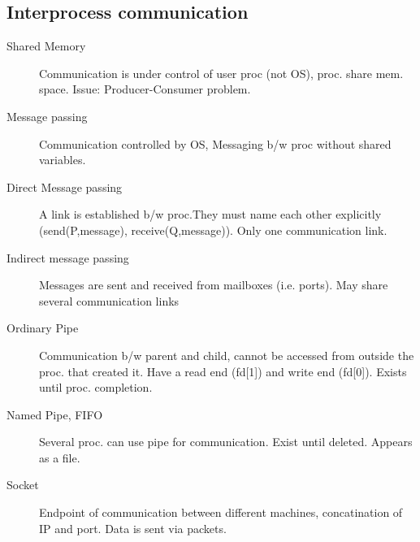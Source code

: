 \subsection*{Interprocess communication}
\begin{description}
  \item[Shared Memory]Communication is under control of user proc (not OS), proc. share mem. space. Issue: Producer-Consumer problem. 
  \item[Message passing] Communication controlled by OS, Messaging b/w proc without shared variables.
  \item[Direct Message passing] A link is established b/w proc.They must name each other explicitly (send(P,message), receive(Q,message)). Only one communication link.
  \item[Indirect message passing] Messages are sent and received from mailboxes (i.e. ports). May share several communication links
  \item[Ordinary Pipe] Communication b/w parent and child, cannot be accessed from outside the proc. that created it. Have a read end (fd[1]) and write end (fd[0]). Exists until proc. completion.
  \item[Named Pipe, FIFO] Several proc. can use pipe for communication. Exist until deleted. Appears as a file.
  \item[Socket] Endpoint of communication between different machines, concatination of IP and port. Data is sent via packets.
\end{description}
